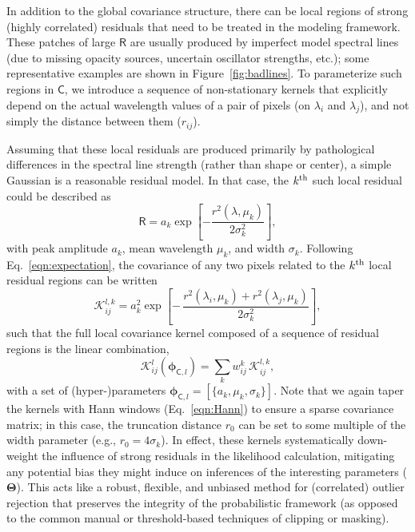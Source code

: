 \documentclass[iop,floatfix,twocolappendix]{emulateapj}
\newcommand{\vR}{\mathsf{R}}
\newcommand{\vC}{\mathsf{C}}
\newcommand{\vT}{ {\bm \Theta}}
\newcommand{\vp}{ {\bm \phi}}
\newcommand{\KK}{\mathcal{K}}
\newcommand{\Klocal}{\KK^l}
\begin{document}
In addition to the global covariance structure, there can be local regions of strong (highly 
correlated) residuals that need to be treated in the modeling framework.  These patches of large 
$\vR$ are usually produced by imperfect model spectral lines (due to missing opacity sources, 
uncertain oscillator strengths, etc.); some representative examples are shown in 
Figure~\ref{fig:badlines}.  To parameterize such regions in $\vC$, we introduce a sequence of 
non-stationary kernels that explicitly depend on the actual wavelength values of a pair of pixels 
(on $\lambda_i$ and $\lambda_j$), and not simply the distance between them ($r_{ij}$).  

Assuming that these local residuals are produced primarily by pathological differences in the 
spectral line strength (rather than shape or center), a simple Gaussian is a reasonable residual 
model.  In that case, the $k^{\rm th}$ such local residual could be described as
\begin{equation}
\vR = a_k \exp \left[ - \frac{r^2(\lambda,\mu_k)}{2\sigma_k^2} \right],
\end{equation}
with peak amplitude $a_k$, mean wavelength $\mu_k$, and width $\sigma_k$.  Following 
Eq.~\ref{eqn:expectation}, the covariance of any two pixels related to the $k^{\rm th}$ local 
residual regions can be written
\begin{equation} \label{eqn:kregion}
  \mathcal{K}^{l,k}_{ij} = a_k^2 \exp \left [ - \, \frac{r^2(\lambda_i, \mu_k) + r^2(\lambda_j, \mu_k)}{2 \sigma_k^2}\right ],
\end{equation}
such that the full local covariance kernel composed of a sequence of residual regions is the linear 
combination,
\begin{equation} \label{eqn:klocal}
\Klocal_{ij}(\vp_{{\mathsf C},l}) = \sum_k w^k_{ij} \, \mathcal{K}^{l,k}_{ij},
\end{equation}
with a set of (hyper-)parameters $\vp_{{\mathsf C},l} = [\{a_k, \mu_k, \sigma_k\}]$.  Note that we 
again taper the kernels with Hann windows (Eq.~\ref{eqn:Hann}) to ensure a sparse covariance 
matrix; in this case, the truncation distance $r_0$ can be set to some multiple of the width 
parameter (e.g., $r_0 = 4\sigma_k$).  In effect, these kernels systematically down-weight the 
influence of strong residuals in the likelihood calculation, mitigating any potential bias they 
might induce on inferences of the interesting parameters ($\vT$).  This acts like a robust, 
flexible, and unbiased method for (correlated) outlier rejection that preserves the integrity of 
the probabilistic framework (as opposed to the common manual or threshold-based techniques of 
clipping or masking).  
\end{document}
